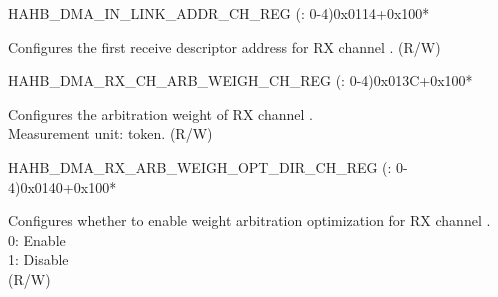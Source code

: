\begin{register}{H}{AHB\_DMA\_IN\_LINK\_ADDR\_CH\_REG (: 0-4)}{0x0114+0x100*}\label{regdesc:AHBDMAINLINKADDRCHNREG}
%
\regnewline%
\begin{regdesc}\begin{reglist}
\label{fielddesc:AHBDMAINLINKADDRCHN}\item [AHB\_DMA\_INLINK\_ADDR\_CH\regindex{n}] Configures the first receive descriptor address for RX channel . (R/W)
\end{reglist}\end{regdesc}
\end{register}


\begin{register}{H}{AHB\_DMA\_RX\_CH\_ARB\_WEIGH\_CH\_REG (: 0-4)}{0x013C+0x100*}\label{regdesc:AHBDMARXCHARBWEIGHCHNREG}
%
%
\regnewline%
\begin{regdesc}\begin{reglist}
\label{fielddesc:AHBDMARXCHARBWEIGHCHN}\item [AHB\_DMA\_RX\_CH\_ARB\_WEIGH\_CH\regindex{n}] Configures the arbitration weight of RX channel .\\Measurement unit: token. (R/W)
\end{reglist}\end{regdesc}
\end{register}


\begin{register}{H}{AHB\_DMA\_RX\_ARB\_WEIGH\_OPT\_DIR\_CH\_REG (: 0-4)}{0x0140+0x100*}\label{regdesc:AHBDMARXARBWEIGHOPTDIRCHNREG}
%
%
\regnewline%
\begin{regdesc}\begin{reglist}
\label{fielddesc:AHBDMARXARBWEIGHOPTDIRCHN}\item [AHB\_DMA\_RX\_ARB\_WEIGH\_OPT\_DIR\_CH\regindex{n}] Configures whether to enable weight arbitration optimization for RX channel .\\
0: Enable\\
1: Disable\\ (R/W)
\end{reglist}\end{regdesc}
\end{register}


